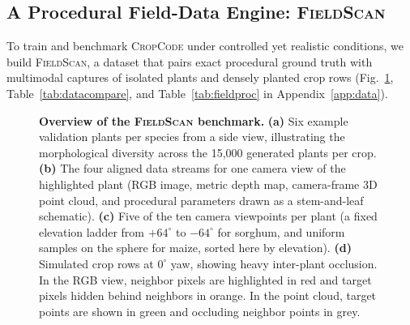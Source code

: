 \documentclass[10pt,twocolumn,letterpaper]{article}
\newcommand{\method}{\textsc{CropCode}}
\newcommand{\dataset}{\textsc{FieldScan}}
\begin{document}
\subsection{A Procedural Field-Data Engine: \dataset{}}
\label{sec:method-data}

To train and benchmark \method{} under controlled yet realistic conditions, we build \dataset{}, a dataset that pairs exact procedural ground truth with multimodal captures of isolated plants and densely planted crop rows (Fig.~\ref{fig:dataset}, Table~\ref{tab:datacompare}, and Table~\ref{tab:fieldproc} in Appendix~\ref{app:data}).

\begin{figure}[t]
  \centering
  \resizebox{\linewidth}{!}{}
  \caption{\textbf{Overview of the \dataset{} benchmark.} \textbf{(a)} Six example validation plants per species from a side view, illustrating the morphological diversity across the 15{,}000 generated plants per crop. \textbf{(b)} The four aligned data streams for one camera view of the highlighted plant (RGB image, metric depth map, camera-frame 3D point cloud, and procedural parameters drawn as a stem-and-leaf schematic). \textbf{(c)} Five of the ten camera viewpoints per plant (a fixed elevation ladder from $+64^\circ$ to $-64^\circ$ for sorghum, and uniform samples on the sphere for maize, sorted here by elevation). \textbf{(d)} Simulated crop rows at $0^\circ$ yaw, showing heavy inter-plant occlusion. In the RGB view, neighbor pixels are highlighted in red and target pixels hidden behind neighbors in orange. In the point cloud, target points are shown in green and occluding neighbor points in grey.}
  \label{fig:dataset}
\end{figure}
\end{document}
